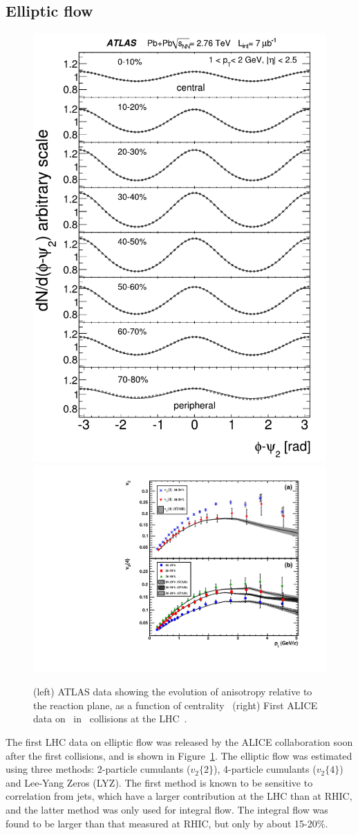 \subsection{Elliptic flow}
\begin{figure}[!tb]
\begin{center}
\includegraphics[height=0.49\textwidth]{flowcorrelations_figs/atlas_v2_fig_02.pdf}
\includegraphics[height=0.49\textwidth]{flowcorrelations_figs/fig2.pdf}
\caption[]{(left) ATLAS data showing the evolution of anisotropy relative to the reaction plane, as a function of centrality~\cite{ATLAS:2011ah} (right) First ALICE data on \vtwo\ in \PbPb\ collisions at the LHC~\cite{Aamodt:2010pa}.}
\label{fig:pas:fc:firstresults}
\end{center}
\end{figure}
The first LHC data on elliptic flow was released by the ALICE collaboration soon after the first collisions,
and is shown in Figure~\ref{fig:pas:fc:firstresults}.
The elliptic flow was estimated using three methods: 2-particle cumulants ($v_2\{2\}$), 4-particle cumulants ($v_2\{4\}$)
and Lee-Yang Zeros (LYZ).  The first method is known to be sensitive to correlation from jets, which have
a larger contribution at the LHC than at RHIC, and the latter method was only used for integral flow.
The integral flow was found to be larger than that measured at RHIC, but only by about 15-20\%.
